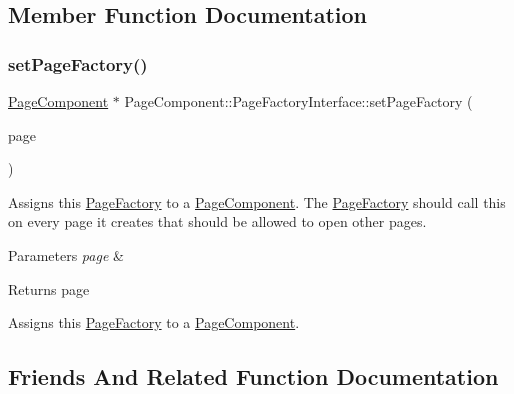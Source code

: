 \subsection{Member Function Documentation}
\mbox{\label{classPageComponent_1_1PageFactoryInterface_a6e32640cdfb7e12b0c7172d74195de56}} 
\subsubsection{\texorpdfstring{set\+Page\+Factory()}{setPageFactory()}}
{\footnotesize\ttfamily \mbox{\hyperlink{classPageComponent}{Page\+Component}} $\ast$ Page\+Component\+::\+Page\+Factory\+Interface\+::set\+Page\+Factory (\begin{DoxyParamCaption}\item[{\mbox{\hyperlink{classPageComponent}{Page\+Component}} $\ast$}]{page }\end{DoxyParamCaption})\hspace{0.3cm}{\ttfamily [protected]}}

Assigns this \mbox{\hyperlink{classPageFactory}{Page\+Factory}} to a \mbox{\hyperlink{classPageComponent}{Page\+Component}}. The \mbox{\hyperlink{classPageFactory}{Page\+Factory}} should call this on every page it creates that should be allowed to open other pages.


\begin{DoxyParams}{Parameters}
{\em page} & \\
\hline
\end{DoxyParams}
\begin{DoxyReturn}{Returns}
page
\end{DoxyReturn}
Assigns this \mbox{\hyperlink{classPageFactory}{Page\+Factory}} to a \mbox{\hyperlink{classPageComponent}{Page\+Component}}. 

\subsection{Friends And Related Function Documentation}
\mbox{\label{classPageComponent_1_1PageFactoryInterface_ad38036d55f115286c52feb1c6fcf3b39}} 
